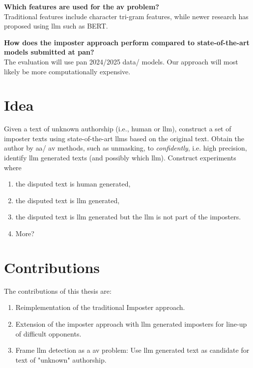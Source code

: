 \begin{questions}
    \item \textbf{Which features are used for the \ac{av} problem?} \label{enum:rq3} \hfill \\
    Traditional features include character tri-gram features, while newer research has proposed using \ac{llm} such as BERT.

    \item \textbf{How does the imposter approach perform compared to state-of-the-art models submitted at \ac{pan}?} \label{enum:rq4} \hfill \\
    The evaluation will use \ac{pan} 2024/2025 data/ models.
    Our approach will most likely be more computationally expensive.
\end{questions}

\section{Idea}
\label{sec:idea}

Given a text of unknown authorship (i.e., human or \ac{llm}), 
construct a set of imposter texts using state-of-the-art \acp{llm} based on the original text.
Obtain the author by \ac{aa}/ \ac{av} methods, such as unmasking, to \textit{confidently}, i.e. high precision, identify \ac{llm} generated texts
(and possibly which \ac{llm}).
Construct experiments where
\begin{enumerate}
    \item the disputed text is human generated,
    \item the disputed text is \ac{llm} generated,
    \item the disputed text is \ac{llm} generated but the \ac{llm} is not part of the imposters.
    \item More?
\end{enumerate}


\section{Contributions}
\label{sec:contributions}
The contributions of this thesis are:
\begin{enumerate}
    \item Reimplementation of the traditional Imposter approach.
    \item Extension of the imposter approach with \ac{llm} generated imposters for line-up of difficult opponents. 
    \item Frame \ac{llm} detection as a \ac{av} problem: Use \ac{llm} generated text as candidate for text of "unknown" authorship.
\end{enumerate}
